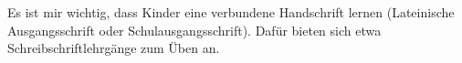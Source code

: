 Es ist mir wichtig, dass Kinder eine verbundene Handschrift lernen (Lateinische Ausgangsschrift oder Schulausgangsschrift).
Dafür bieten sich etwa Schreibschriftlehrgänge zum Üben an.